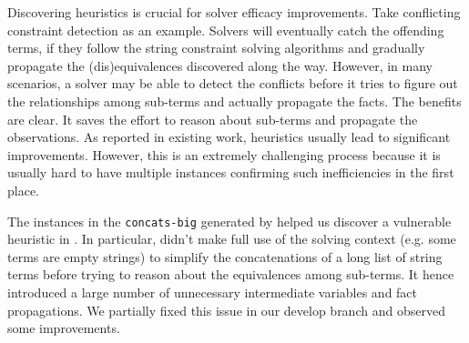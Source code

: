 Discovering heuristics is crucial for solver efficacy improvements. Take 
conflicting constraint detection as an example. Solvers will eventually catch 
the offending terms, if they follow the string constraint solving algorithms and 
gradually propagate the (dis)equivalences discovered along the way. However, in 
many scenarios, a solver may be able to detect the conflicts before it tries to 
figure out the relationships among sub-terms and actually propagate the facts. 
The benefits are clear. It saves the effort to reason about sub-terms and 
propagate the observations. As reported in existing work, heuristics usually 
lead to significant improvements. However, this is an extremely challenging 
process because it is usually hard to have multiple instances confirming such inefficiencies in the first place.

The instances in the \texttt{concats-big} generated by \fuzzer{} helped us 
discover a vulnerable heuristic in \us{}. In particular, \us{} didn't make full use 
of the solving context (e.g. some terms are empty strings) to simplify the 
concatenations of a long list of string terms before trying to reason about the 
equivalences among sub-terms. It hence introduced a large number of unnecessary 
intermediate variables and fact propagations. We partially fixed this issue in 
our develop branch and observed some improvements.




        
        
        



